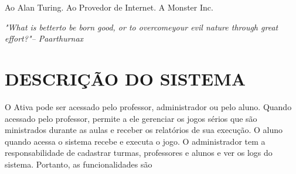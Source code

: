 \documentclass{utfpr-pg}
\let\oldlstlistoflistings\lstlistoflistings
\renewcommand{\lstlistoflistings}{%
  \begingroup%
  \let\oldnumberline\numberline%
  \renewcommand{\numberline}{\lstlistingname~\oldnumberline}%
  \oldlstlistoflistings*%
  \endgroup}
\renewcommand{\lstlistingname}{Código}
\begin{document}
\frenchspacing





\imprimircapa
\imprimirfolhaderosto

\cleardoublepage

% 


\begin{agradecimentos}
    Ao Alan Turing.\smallbreak 
    Ao Provedor de Internet.\smallbreak
    A Monster Inc.\smallbreak
\end{agradecimentos}

\begin{epigrafe}
    \vspace*{\fill}
	\begin{flushright}
		\textit{"What is better\smallbreak to be born good, or to overcome\smallbreak  your evil nature through great effort?"\smallbreak -- Paarthurnax}
	\end{flushright}
\end{epigrafe}



\listoffigures
\cleardoublepage







\tableofcontents*
\cleardoublepage

\textual
  \pagestyle{simple}

\chapter{DESCRIÇÃO DO SISTEMA}
  \label{chapter:descsistema}
  O Ativa pode ser acessado pelo professor, administrador ou pelo aluno. Quando acessado pelo professor, permite a ele gerenciar os jogos sérios que são ministrados durante as aulas e receber os relatórios de sua execução. O aluno quando acessa o sistema recebe e executa o jogo. O administrador tem a responsabilidade de cadastrar turmas, professores e alunos e ver os logs do sistema. Portanto, as funcionalidades são \cite{simone2020}
  
  
\end{document}
